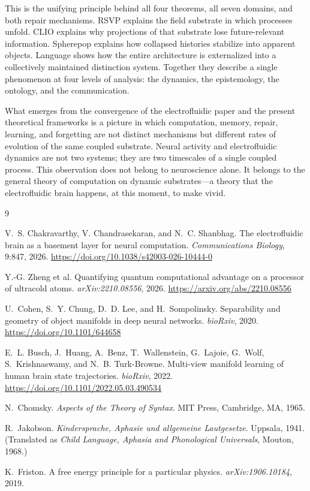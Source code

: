 \documentclass[12pt,a4paper]{article}
\begin{document}
\noindent This is the unifying principle behind all four theorems, all seven domains, and both repair mechanisms. RSVP explains the field substrate in which processes unfold. CLIO explains why projections of that substrate lose future-relevant information. Spherepop explains how collapsed histories stabilize into apparent objects. Language shows how the entire architecture is externalized into a collectively maintained distinction system. Together they describe a single phenomenon at four levels of analysis: the dynamics, the epistemology, the ontology, and the communication.

What emerges from the convergence of the electrofluidic paper and the present theoretical frameworks is a picture in which computation, memory, repair, learning, and forgetting are not distinct mechanisms but different rates of evolution of the same coupled substrate. Neural activity and electrofluidic dynamics are not two systems; they are two timescales of a single coupled process. This observation does not belong to neuroscience alone. It belongs to the general theory of computation on dynamic substrates---a theory that the electrofluidic brain happens, at this moment, to make vivid.


\begin{thebibliography}{9}

V.~S. Chakravarthy, V. Chandrasekaran, and N.~C. Shanbhag.
\newblock The electrofluidic brain as a basement layer for neural computation.
\newblock \emph{Communications Biology}, 9:847, 2026.
\newblock \url{https://doi.org/10.1038/s42003-026-10444-0}

Y.-G. Zheng et al.
\newblock Quantifying quantum computational advantage on a processor of ultracold atoms.
\newblock \emph{arXiv:2210.08556}, 2026.
\newblock \url{https://arxiv.org/abs/2210.08556}

U.~Cohen, S.~Y. Chung, D.~D. Lee, and H.~Sompolinsky.
\newblock Separability and geometry of object manifolds in deep neural networks.
\newblock \emph{bioRxiv}, 2020.
\newblock \url{https://doi.org/10.1101/644658}

E.~L. Busch, J.~Huang, A.~Benz, T.~Wallenstein, G.~Lajoie, G.~Wolf, S.~Krishnaswamy, and N.~B. Turk-Browne.
\newblock Multi-view manifold learning of human brain state trajectories.
\newblock \emph{bioRxiv}, 2022.
\newblock \url{https://doi.org/10.1101/2022.05.03.490534}

N.~Chomsky.
\newblock \emph{Aspects of the Theory of Syntax}.
\newblock MIT Press, Cambridge, MA, 1965.

R.~Jakobson.
\newblock \emph{Kindersprache, Aphasie und allgemeine Lautgesetze}.
\newblock Uppsala, 1941.
\newblock (Translated as \emph{Child Language, Aphasia and Phonological Universals}, Mouton, 1968.)

K.~Friston.
\newblock A free energy principle for a particular physics.
\newblock \emph{arXiv:1906.10184}, 2019.

\end{thebibliography}
\end{document}
